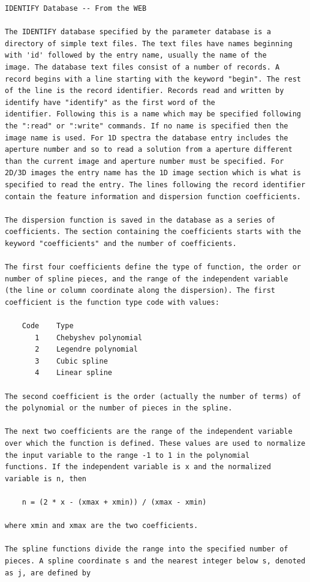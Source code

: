 \begin{verbatim} 
IDENTIFY Database -- From the WEB

The IDENTIFY database specified by the parameter database is a
directory of simple text files. The text files have names beginning
with 'id' followed by the entry name, usually the name of the
image. The database text files consist of a number of records. A
record begins with a line starting with the keyword "begin". The rest
of the line is the record identifier. Records read and written by
identify have "identify" as the first word of the
identifier. Following this is a name which may be specified following
the ":read" or ":write" commands. If no name is specified then the
image name is used. For 1D spectra the database entry includes the
aperture number and so to read a solution from a aperture different
than the current image and aperture number must be specified. For
2D/3D images the entry name has the 1D image section which is what is
specified to read the entry. The lines following the record identifier
contain the feature information and dispersion function coefficients.

The dispersion function is saved in the database as a series of
coefficients. The section containing the coefficients starts with the
keyword "coefficients" and the number of coefficients.

The first four coefficients define the type of function, the order or
number of spline pieces, and the range of the independent variable
(the line or column coordinate along the dispersion). The first
coefficient is the function type code with values:

	Code	Type
	   1	Chebyshev polynomial
	   2	Legendre polynomial
	   3	Cubic spline
	   4	Linear spline

The second coefficient is the order (actually the number of terms) of
the polynomial or the number of pieces in the spline.

The next two coefficients are the range of the independent variable
over which the function is defined. These values are used to normalize
the input variable to the range -1 to 1 in the polynomial
functions. If the independent variable is x and the normalized
variable is n, then

	n = (2 * x - (xmax + xmin)) / (xmax - xmin)

where xmin and xmax are the two coefficients.

The spline functions divide the range into the specified number of
pieces. A spline coordinate s and the nearest integer below s, denoted
as j, are defined by


\end{verbatim}
